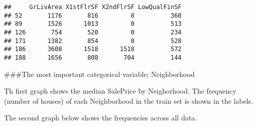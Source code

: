 \documentclass[]{article}
\begin{document}
\begin{verbatim}
##     GrLivArea X1stFlrSF X2ndFlrSF LowQualFinSF
## 52       1176       816         0          360
## 89       1526      1013         0          513
## 126       754       520         0          234
## 171      1382       854         0          528
## 186      3608      1518      1518          572
## 188      1656       808       704          144
\end{verbatim}

\#\#\#The most important categorical variable; Neighborhood

Th first graph shows the median SalePrice by Neighorhood. The frequency
(number of houses) of each Neighborhood in the train set is shown in the
labels.

The second graph below shows the frequencies across all data.
\end{document}
